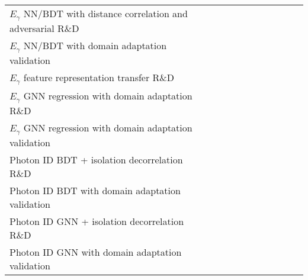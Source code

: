 \documentclass{standalone}
\begin{document}
{\setlength{\tabcolsep}{5pt}%
  \begin{threeparttable}%
    \captionsetup{skip=4pt}%
    \begin{tabular}{|l|>{\centering}m{5mm}:>{\centering}m{5mm}|>{\centering}m{5mm}:>{\centering}m{5mm}|>{\centering}m{5mm}:>{\centering}m{5mm}|>{\centering}m{5mm}:>{\centering}m{5mm}|>{\centering}m{5mm}:>{\centering\arraybackslash}m{5mm}|} \hline
      &  &  & & &  \\
      \hline\hline
      $E_{\gamma}$ NN/BDT with distance correlation and adversarial R\&D &  &  &  & & & &  & & & \\ \hline
      $E_{\gamma}$ NN/BDT  with domain adaptation validation & & &  &  &  & & & & & \\ \hline
      $E_{\gamma}$ feature representation transfer R\&D & &  &  &   &  &  &  & & & \\ \hline
      $E_{\gamma}$ GNN regression with domain adaptation R\&D & & & & &   &  &   & & & \\ \hline
      $E_{\gamma}$ GNN regression with domain adaptation validation & & & & & & & &  &  & \\ \hline\hline
      Photon ID BDT + isolation decorrelation R\&D &  &  &  & & & &  & & & \\ \hline
      Photon ID BDT with domain adaptation validation & & &  &  &  & & & & & \\ \hline
      Photon ID GNN + isolation decorrelation R\&D  & & & & &   &  &   & & & \\ \hline
      Photon ID GNN with domain adaptation validation & & & & & & & &  &  & \\ \hline\hline

\end{tabular}
\end{threeparttable}}
\end{document}
